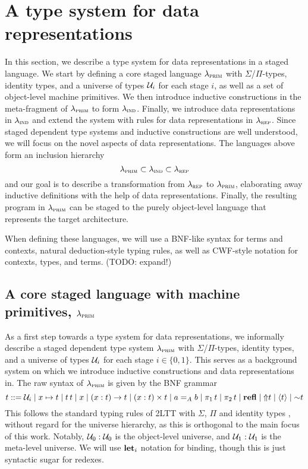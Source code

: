 
\section{A type system for data representations}\label{sec:type-system}

In this section, we describe a type system for data representations in a staged
language. We start by defining a core staged language $\lambdaprim$ with
$\Sigma$/$\Pi$-types, identity types, and a universe of types $\univ_i$ for
each stage $i$, as well as a set of object-level machine primitives. We then
introduce inductive constructions in the meta-fragment of $\lambdaprim$ to form
$\lambdaind$. Finally, we introduce data representations in $\lambdaind$ and
extend the system with rules for data representations in $\lambdarep$. Since
staged dependent type systems and inductive constructions are well understood,
we will focus on the novel aspects of data representations. The languages above
form an inclusion hierarchy
\[
  \lambdaprim \subset \lambdaind \subset \lambdarep
\]
and our goal is to describe a transformation from $\lambdarep$ to
$\lambdaprim$, elaborating away inductive definitions with the help of data
representations. Finally, the resulting program in $\lambdaprim$ can be staged
to the purely object-level language that represents the target architecture.

When defining these languages, we will use a BNF-like syntax for terms and
contexts, natural deduction-style typing rules, as well as CWF-style notation
for contexts, types, and terms. (TODO: expand!)

\subsection{A core staged language with machine primitives, $\lambdaprim$}
\newcommand{\seq}[2]{[#1; #2]}

As a first step towards a type system for data representations, we informally
describe a staged dependent type system $\lambdaprim$ with
$\Sigma$/$\Pi$-types, identity types, and a universe of types $\univ_i$ for
each stage $i \in \{0, 1\}$. This serves as a background system on which we
introduce inductive constructions and data representations in. The raw syntax
of $\lambdaprim$ is given by the BNF grammar
\[
  t ::= \univ_i \mid x \mapsto t \mid t \, t \mid x \mid (x : t) \to t \mid (x : t) \times t \mid
  \Id{A}{a}{b} \mid \pi_1 \, t \mid \pi_2 \, t \mid \kwd{refl} \mid \lift t \mid \quot t \mid \splice t
\]
This follows the standard typing rules of 2LTT with $\Sigma$, $\Pi$ and
identity types \cite{Kovacs2022-vb}, without regard for the universe hierarchy,
as this is orthogonal to the main focus of this work. Notably, $\univ_0 :
  \univ_0$ is the object-level universe, and $\univ_1 : \univ_1$ is the
meta-level universe. We will use $\kwd{let}_i$ notation for binding, though
this is just syntactic sugar for redexes.

